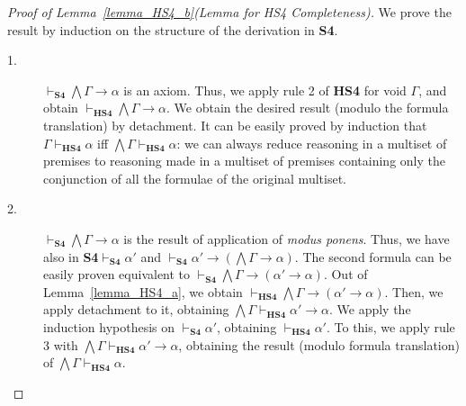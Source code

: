 \documentclass[a4paper]{article}
\newcommand{\SFour}{\textbf{S4}\xspace}
\begin{document}
\begin{proof}[Proof of Lemma~\ref{lemma_HS4_b}(Lemma for HS4 Completeness)]
 We prove the result by induction on the structure of the derivation in \SFour.
\begin{description}
    \item[1.] $\vdash_{\SFour}\bigwedge\Gamma \rightarrow \alpha$ is an axiom. Thus, we apply rule 2 of \textbf{HS4} for void $\Gamma$, and obtain $\vdash_{\textbf{HS4}}\bigwedge\Gamma \rightarrow \alpha$. We obtain the desired result (modulo the formula translation) by detachment. It can be easily proved by induction that $\Gamma \vdash_{\textbf{HS4}}\alpha$ iff $\bigwedge \Gamma \vdash_{\textbf{HS4}}\alpha$: we can always reduce reasoning in a multiset of premises to reasoning made in a multiset of premises containing only the conjunction of all the formulae of the original multiset.

\item[2.] $\vdash_{\SFour}\bigwedge\Gamma \rightarrow \alpha$ is the result of application of \textit{modus ponens}. Thus, we have also in \SFour $\vdash_{\SFour}\alpha'$ and $\vdash_{\SFour}\alpha' \rightarrow (\bigwedge \Gamma \rightarrow \alpha)$. The second formula can be easily proven equivalent to $\vdash_{\SFour}\bigwedge \Gamma \rightarrow (\alpha' \rightarrow \alpha)$. Out of Lemma~\ref{lemma_HS4_a}, we obtain $\vdash_{\textbf{HS4}}\bigwedge \Gamma \rightarrow (\alpha' \rightarrow \alpha)$. Then, we apply detachment to it, obtaining $\bigwedge \Gamma \vdash_{\textbf{HS4}} \alpha' \rightarrow \alpha$. We apply the induction hypothesis on $\vdash _{\SFour}\alpha'$, obtaining $\vdash _{\textbf{HS4}}\alpha'$. To this, we apply rule 3 with $\bigwedge \Gamma \vdash_{\textbf{HS4}} \alpha' \rightarrow \alpha$, obtaining the result (modulo formula translation) of $\bigwedge \Gamma \vdash_{\textbf{HS4}} \alpha$.
    

    
\end{description}   
\end{proof}
\end{document}
